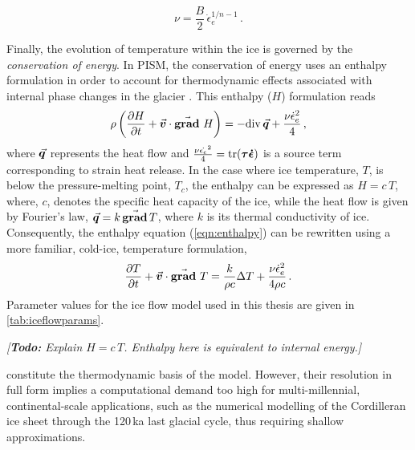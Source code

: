 \documentclass{article}
\newcommand{\todo}[1]{\emph{[\textbf{Todo:} #1]}}
\newcommand{\vect}[1]{\va*{#1}} %
\newcommand{\tens}[1]{\vb*{#1}} %
\renewcommand{\div}[1]{\mathrm{div}\,#1}            %
\renewcommand{\grad}[1]{\vect{\mathrm{grad}}\,#1}   %
\newcommand{\matdv}[1]{\pdv{#1}{t}+\vect{v}\cdot\grad{}\,#1}  %
\newcommand{\doteps}[0]{\dot{\epsilon}} %
\newcommand{\DST}[0]{\tens{\tau}}       %
\newcommand{\SRT}[0]{\tens{\doteps}}    %
\begin{document}
\begin{equation}
    \label{eqn:viscosity}
    \nu = \frac{B}{2}\,\doteps_e^{1/n-1} \,.
\end{equation}

Finally, the evolution of temperature within the ice is governed by the
\emph{conservation of energy}. In PISM, the conservation of energy uses an
enthalpy formulation in order to
account for thermodynamic effects associated with internal phase changes in the
glacier \citep[Eqs.~20--21]{Aschwanden.etal.2012}. This enthalpy ($H$) formulation reads
\begin{equation}
    \label{eqn:enthalpy}
    \rho \left(\matdv{H}\right)
        = -\div{\vect{q}} + \frac{\nu\doteps_e^2}{4} \,,
\end{equation}
where $\vect{q}$ represents the heat flow and
${\frac{\nu\dot{\epsilon_e}^2}{4} = \tr(\DST\SRT)}$ is a
source term corresponding to strain heat release. In the case where ice
temperature, $T$, is below the pressure-melting point, $T_c$, the enthalpy can be
expressed as $H=c\,T$, where, $c$, denotes the specific heat capacity of the ice, while the heat flow is given by Fourier's law,
$\vect{q} = k\,\grad{T}$, where $k$ is its thermal conductivity of ice. Consequently, the enthalpy equation
(\ref{eqn:enthalpy}) can be rewritten using a more familiar, cold-ice,
temperature formulation,
\begin{equation}
    \label{eqn:temperature}
    \matdv{T} = \frac{k}{\rho c} \Delta T
                + \frac{\nu\doteps_e^2}{4\rho c} \,.
\end{equation}
Parameter values for the ice flow model used in this thesis are
given in \cref{tab:iceflowparams}.

\todo{Explain $H=c\,T$. Enthalpy here is equivalent to internal energy.}

constitute the thermodynamic basis
of the model. However, their resolution in full form implies a computational
demand too high for multi-millennial, continental-scale applications, such as
the numerical modelling of the Cordilleran ice sheet through the 120\,ka last glacial
cycle, thus requiring shallow approximations.
\end{document}
